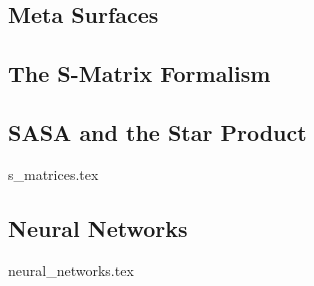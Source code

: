 \subsection{Meta Surfaces}

\subsection{The S-Matrix Formalism}

\subsection{SASA and the Star Product}
{s_matrices.tex}


\subsection{Neural Networks}
{neural_networks.tex}
